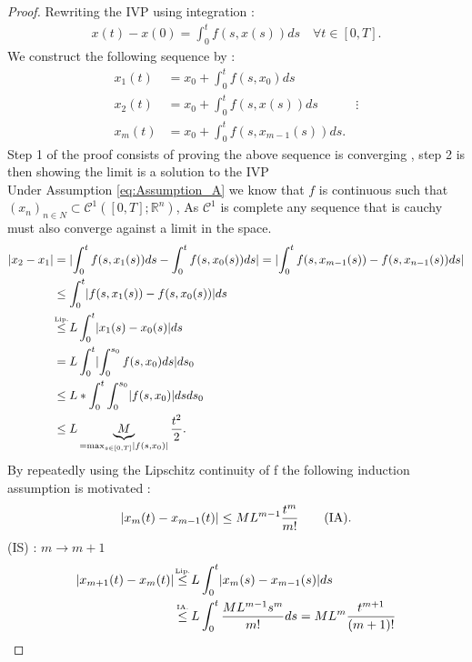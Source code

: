 \begin{proof}[Proof]
  Rewriting the IVP using integration : 
  \begin{align*}
    x(t) - x(0) = \int_0^{t }f(s,x(s)) ds   \quad \forall  t \in  [0,T]
  .\end{align*}
  We construct the following sequence by : 
  \begin{align*}
    x_1(t) &= x_0 + \int_0^{t }f(s,x_0) ds \\
    x_{2}(t) &= x_0 + \int_0^{t} f(s,x(s)) ds 
             &\vdots \\
    x_m(t) &= x_0 + \int_0^{t} f(s,x_{m-1}(s)) ds 
  .\end{align*}
  Step 1 of the proof consists of proving the above sequence is converging , step 2 is then showing the limit is a solution to the IVP\\[1ex]
  Under Assumption \ref{eq:Assumption_A} we know that $f$ is continuous such that $(x_n)_{n \in  N} \subset \mathcal{C}^{1}([0,T];\mathbb{R}^{n} ) $, 
  As $\mathcal{C}^{1} $ is complete any sequence that is cauchy must also converge against a limit in the space. \\[1ex]
  \begin{align*}
    \abs{x_2 - x_1} &= \abs{\int_{0}^{t} f(s,x_{1}(s)) ds  -  \int_{0}^{t} f(s,x_{0}(s)) ds  } = \abs{\int_{0}^{t} f(s,x_{m-1}(s))  - f(s,x_{n-1}(s)) ds } \\
                    &\le \int_0^{t} \abs{f(s,x_{1}(s)) - f(s,x_{0}(s))} ds    \\ 
                    &\myS{Lip.}{\le }  L \int_0^{t} \abs{x_{1}(s) - x_{0}(s) } ds  \\
                    &= L \int_0^{t } \abs{\int_0^{s_0} f(s,x_0) ds} ds_0  \\
                    &\le L * \int_0^{t} \int_0^{s_0} \abs{f(s,x_0)} ds ds_0  \\
                    &\le L \underbrace{M}_{=\max_{s \in  [0,T]}\abs{f(s,x_0)}} \frac{t^2}{2}  
  .\end{align*}
  By repeatedly using  the Lipschitz continuity of f the following induction assumption is motivated : 
  \begin{align*}
    \lvert x_m(t) - x_{m-1}(t)\rvert \le M L^{m-1} \frac{t^m}{m!}  \tag{IA}
  .\end{align*}
  (IS) :  $m \to  m+1$
  \begin{align*}
    \abs{x_{m+1}(t) - x_{m}(t)} &\myS{Lip.}{\le }  L \int_0^{t} \abs{x_m(s)-x_{m-1}(s)} ds \\
                                &\myS{IA.}{\le } L \int_0^{t} \frac{M L^{m-1} s^{m}  }{m!} ds = ML^{m}  \frac{t^{m+1} }{(m+1)!}

\end{align*}
\end{proof}
